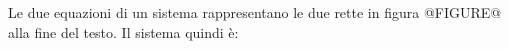 Le due equazioni di un sistema rappresentano le due rette 
in figura @FIGURE@ alla fine del testo.
Il sistema quindi è: 
